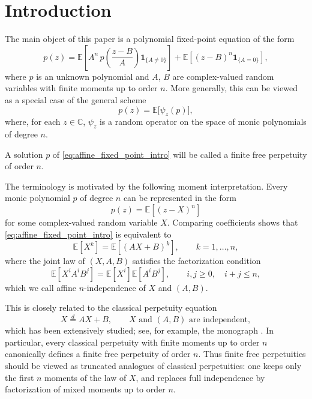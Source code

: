 \documentclass[a4paper,11pt]{amsart}
\numberwithin{equation}{section}
\newcommand{\C}{\mathbb{C}}
\newcommand{\E}{\mathbb{E}}
\begin{document}
\maketitle


\section{Introduction}
The main object of this paper is a polynomial fixed-point equation of the form
\begin{equation}\label{eq:affine_fixed_point_intro}
p(z)
=
\E\!\left[
A^{n}\,p\!\left(\frac{z-B}{A}\right)\mathbf{1}_{\{A\neq0\}}
\right]
+
\E\!\left[
(z-B)^n\mathbf{1}_{\{A=0\}}
\right],
\end{equation}
where $p$ is an unknown polynomial and \(A\), \(B\) are complex-valued random variables with finite moments up to order \(n\).
 More generally, this can be viewed as a special case of the general scheme
\[
p(z)=\E\big[\psi_z(p)\big],
\]
where, for each \(z\in\C\), \(\psi_z\) is a random operator on the space of monic polynomials of degree \(n\).

A solution \(p\) of \eqref{eq:affine_fixed_point_intro} will be called a finite free perpetuity of order \(n\).

The terminology is motivated by the following moment interpretation.
Every monic polynomial \(p\) of degree \(n\) can be represented in the form
\[
p(z)=\E[(z-X)^n]
\]
for some complex-valued random variable \(X\).
Comparing coefficients shows that \eqref{eq:affine_fixed_point_intro} is equivalent to
\[
\E[X^k]=\E[(AX+B)^k],\qquad k=1,\ldots,n,
\]
where the joint law of \((X,A,B)\) satisfies the factorization condition 
\[
\E[X^iA^iB^j]=\E[X^i]\E[A^iB^j],
\qquad i,j\ge 0,\quad i+j\le n,
\]
which we call affine $n$-independence of $X$ and $(A,B)$. 

This is closely related to the classical perpetuity equation 
\[
X\stackrel{d}{=}AX+B,
\qquad X\text{ and }(A,B) \mbox{ are independent},
\]
which has been extensively studied; see, for example, the monograph \cite{BurBook16}.
In particular, every classical perpetuity with finite moments up to order \(n\) canonically defines a finite free perpetuity of order \(n\). Thus finite free perpetuities should be viewed as truncated analogues of classical perpetuities: one keeps only the first \(n\) moments of the law of \(X\), and replaces full independence by factorization of mixed moments up to order \(n\).
\end{document}
